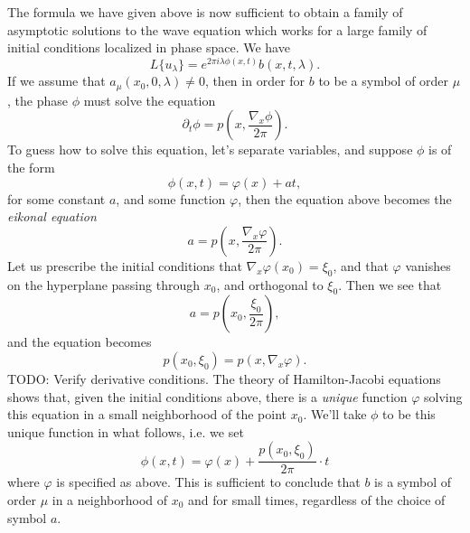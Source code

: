 \documentclass{article}
\theoremstyle{plain}
\theoremstyle{remark}
\theoremstyle{definition}
\begin{document}
The formula we have given above is now sufficient to obtain a family of asymptotic solutions to the wave equation which works for a large family of initial conditions localized in phase space. 
%
%
%
%
%
We have
%
\[ L \{ u_\lambda \} = e^{2 \pi i \lambda \phi(x,t)} b(x,t,\lambda). \]
%
If we assume that $a_\mu(x_0,0,\lambda) \neq 0$, then in order for $b$ to be a symbol of order $\mu$, the phase $\phi$ must solve the equation
%
\[ \partial_t \phi = p \left( x, \frac{\nabla_x \phi}{2 \pi} \right). \]
%
To guess how to solve this equation, let's separate variables, and suppose $\phi$ is of the form
%
\[ \phi(x,t) = \varphi(x) + a t, \]
%
for some constant $a$, and some function $\varphi$, then the equation above becomes the \emph{eikonal equation}
%
\[ a = p \left( x, \frac{\nabla_x \varphi}{2 \pi} \right). \]
%
Let us prescribe the initial conditions that $\nabla_x \varphi(x_0) = \xi_0$, and that $\varphi$ vanishes on the hyperplane passing through $x_0$, and orthogonal to $\xi_0$. Then we see that
%
\[ a = p \left( x_0, \frac{\xi_0}{2 \pi} \right), \]
%
and the equation becomes
%
\[ p \left( x_0, \xi_0 \right) = p \left( x, \nabla_x \varphi \right). \]
%
TODO: Verify derivative conditions. The theory of Hamilton-Jacobi equations shows that, given the initial conditions above, there is a \emph{unique} function $\varphi$ solving this equation in a small neighborhood of the point $x_0$. We'll take $\phi$ to be this unique function in what follows, i.e. we set
%
\[ \phi(x,t) = \varphi(x) + \frac{p( x_0, \xi_0)}{2 \pi} \cdot t \]
%
where $\varphi$ is specified as above. This is sufficient to conclude that $b$ is a symbol of order $\mu$ in a neighborhood of $x_0$ and for small times, regardless of the choice of symbol $a$.
\end{document}
